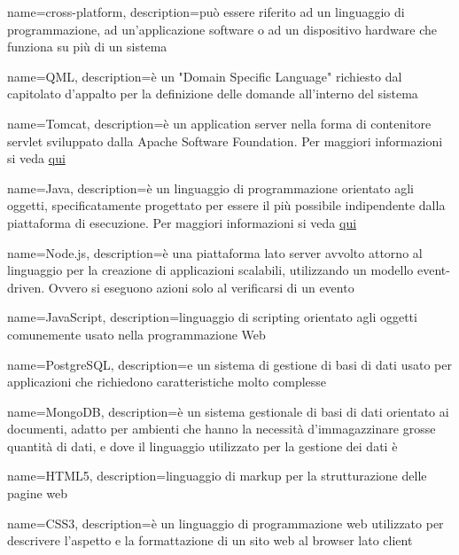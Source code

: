  {
	name=cross-platform,
	description={può essere riferito ad un linguaggio di programmazione, ad un'applicazione software o ad un dispositivo hardware che funziona su più di un sistema}
}

 {
	name=QML,
	description={è un "Domain Specific Language" richiesto dal capitolato d'appalto per la definizione delle domande all'interno del sistema}
}

 {
	name=Tomcat,
	description={è un application server nella forma di contenitore servlet  sviluppato dalla Apache Software Foundation. Per maggiori informazioni si veda \href{https://it.wikipedia.org/wiki/Apache_Tomcat}{qui}}
}

 {
	name=Java,
	description={è un linguaggio di programmazione orientato agli oggetti, specificatamente progettato per essere il più possibile indipendente dalla piattaforma di esecuzione. Per maggiori informazioni si veda \href{https://it.wikipedia.org/wiki/Java_(linguaggio_di_programmazione)}{qui}}
}

 {
	name=Node.js,
	description={è una piattaforma lato server avvolto attorno al linguaggio  per la creazione di applicazioni scalabili, utilizzando un modello event-driven. Ovvero si eseguono azioni solo al verificarsi di un evento }
}

 {
	name=JavaScript,
	description={linguaggio di scripting orientato agli oggetti comunemente usato nella programmazione Web}
}

 {
	name=PostgreSQL,
	description={e un sistema di gestione di basi di dati  usato per applicazioni che richiedono caratteristiche molto complesse }
}

 {
	name=MongoDB,
	description={è un sistema gestionale di basi di dati  orientato ai documenti, adatto per ambienti che hanno la necessità d'immagazzinare grosse quantità di dati, e dove il linguaggio utilizzato per la gestione dei dati è }
}

 {
	name=HTML5,
	description={linguaggio di markup per la strutturazione delle pagine web}
}

 {
	name=CSS3,
	description={è un linguaggio di programmazione web utilizzato per descrivere l'aspetto e la formattazione di un sito web al browser lato client}
}

